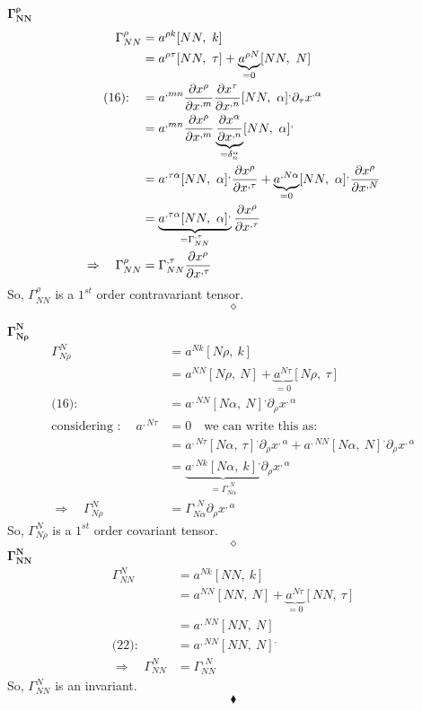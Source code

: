$\boldsymbol{\Gamma^{\rho}_{N N}}$\\
\begin{align}
\Gamma^{\rho }_{N N} &= a^{\rho  k}[N N,\ k]\\
\ & = a^{\rho \tau}[N N,\ \tau]+ \underbrace{a^{\rho N}}_{=0}[N N,\ N]\\
\text{(16):}\quad &= a^{,mn}\pdv{x^\rho}{x^{,m}}\pdv{x^\tau}{x^{,n}}[NN, \ \alpha]^, \partial_{\tau}x^{,\alpha}\\
\ &= a^{,mn}\pdv{x^\rho}{x^{,m}} \underbrace{\pdv{x^{\alpha}}{x^{,n}}}_{= \delta^{\alpha}_{n}}[NN, \ \alpha]^, \\
\ &= a^{, \tau \alpha}[NN, \ \alpha]^,\pdv{x^\rho}{x^{, \tau}}+  \underbrace{a^{,N \alpha}}_{=0}[NN, \ \alpha]^,\pdv{x^\rho}{x^{,N}} \\
\ &= \underbrace{a^{, \tau \alpha}[NN, \ \alpha]^,}_{= \Gamma^{, \tau}_{NN}}\pdv{x^\rho}{x^{, \tau}}  \\
\Rightarrow \quad \Gamma^{\rho }_{N N} &= \Gamma^{, \tau}_{NN}\pdv{x^\rho}{x^{, \tau}}  
\end{align}
So, $\Gamma^{\rho }_{N N}$ is a $1^{st}$ order contravariant tensor.
$$\diamond$$

$\boldsymbol{\Gamma^{N}_{N \rho}}$\\
\begin{align}
\Gamma^{N}_{N \rho} &= a^{N  k}[N \rho,\ k]\\
\ & = a^{N N}[N \rho,\ N]+ \underbrace{a^{N \tau}}_{=0}[N \rho,\ \tau]\\
\text{(16):}\quad &= a^{,NN}[N\alpha, \ N ]^, \partial_{\rho}x^{,\alpha}\\
\text{considering :}\quad \ a^{,N \tau} & =0 \quad \text{we can write this as:}\\
\ &= a^{,N\tau}[N\alpha, \ \tau ]^, \partial_{\rho}x^{,\alpha}+ a^{,NN}[N\alpha, \ N ]^, \partial_{\rho}x^{,\alpha}\\
\ &= \underbrace{a^{,N k}[N \alpha, \ k ]^,}_{= \Gamma^{,N}_{N \alpha}} \partial_{\rho}x^{,\alpha}\\
\Rightarrow \quad \Gamma^{N}_{N \rho} &= \Gamma^{,N}_{N \alpha} \partial_{\rho}x^{,\alpha}
\end{align}
So, $\Gamma^{N}_{N \rho}$ is a $1^{st}$ order covariant tensor.
$$\diamond$$
\newpage
$\boldsymbol{\Gamma^{N}_{N N}}$\\
\begin{align}
\Gamma^{N}_{N N} &= a^{N  k}[N N,\ k]\\
\ & = a^{N N}[N N,\ N]+ \underbrace{a^{N \tau}}_{=0}[N N,\ \tau]\\
\ & = a^{,N N}[N N,\ N]\\
\text{(22):}\quad &= a^{,N N}[N N,\ N]^,\\
\Rightarrow \quad \Gamma^{N}_{N N} &= \Gamma^{,N}_{N N}
\end{align}
So, $\Gamma^{N}_{N N}$ is an invariant.
$$\blacklozenge$$
\newpage
